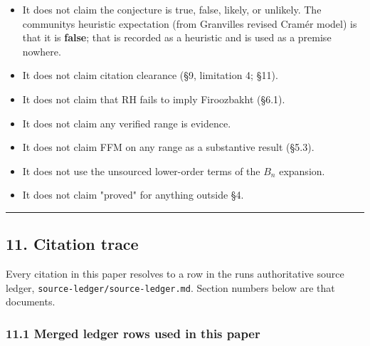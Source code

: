 \documentclass[
  a4paper,
  11pt]{article}
\providecommand{\tightlist}{%
  \setlength{\itemsep}{0pt}\setlength{\parskip}{0pt}}
\begin{document}
\begin{itemize}
\tightlist
\item
  It does not claim the conjecture is true, false, likely, or unlikely.
  The community\textquotesingle s heuristic expectation (from
  Granville\textquotesingle s revised Cramér model) is that it is
  \textbf{false}; that is recorded as a heuristic and is used as a
  premise nowhere.
\item
  It does not claim citation clearance (§9, limitation 4; §11).
\item
  It does not claim that RH fails to imply Firoozbakht (§6.1).
\item
  It does not claim any verified range is evidence.
\item
  It does not claim FFM on any range as a substantive result (§5.3).
\item
  It does not use the unsourced lower-order terms of the \(B_n\)
  expansion.
\item
  It does not claim "proved" for anything outside §4.
\end{itemize}

\begin{center}\rule{0.5\linewidth}{0.5pt}\end{center}

\subsection{11. Citation trace}\label{11-citation-trace}

Every citation in this paper resolves to a row in the
run\textquotesingle s authoritative source ledger,
\texttt{source-ledger/source-ledger.md}. Section numbers below are that
document\textquotesingle s.

\subsubsection{11.1 Merged ledger rows used in this
paper}\label{111-merged-ledger-rows-used-in-this-paper}
\end{document}
